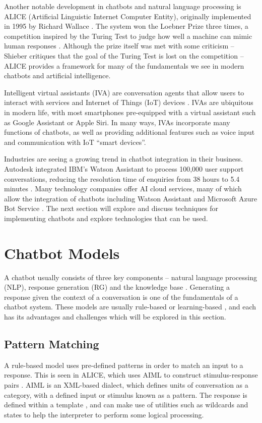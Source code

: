 Another notable development in chatbots and natural language processing is ALICE (Artificial Linguistic Internet Computer Entity), originally implemented in 1995 by Richard Wallace \cite{wallace2009anatomy}. The system won the Loebner Prize three times, a competition inspired by the Turing Test to judge how well a machine can mimic human responses \cite{keedwell2014loebner}. Although the prize itself was met with some criticism -- Shieber critiques that the goal of the Turing Test is lost on the competition \cite{shieber1994lessons} -- ALICE provides a framework for many of the fundamentals we see in modern chatbots and artificial intelligence.

Intelligent virtual assistants (IVA) are conversation agents that allow users to interact with services and Internet of Things (IoT) devices \cite{chung2018intelligent}. IVAs are ubiquitous in modern life, with most smartphones pre-equipped with a virtual assistant such as Google Assistant or Apple Siri. In many ways, IVAs incorporate many functions of chatbots, as well as providing additional features such as voice input and communication with IoT “smart devices”.

Industries are seeing a growing trend in chatbot integration in their business. Autodesk integrated IBM’s Watson Assistant \cite{ibm2017watson} to process 100,000 user support conversations, reducing the resolution time of enquiries from 38 hours to 5.4 minutes \cite{ibm2017autodesk}. Many technology companies offer AI cloud services, many of which allow the integration of chatbots including Watson Assistant and Microsoft Azure Bot Service \cite{microsoft2019azure}. The next section will explore and discuss techniques for implementing chatbots and explore technologies that can be used.

\newpage
\section{Chatbot Models}
A chatbot usually consists of three key components – natural language processing (NLP), response generation (RG) and the knowledge base \cite{cahn2017chatbot}. Generating a response given the context of a conversation is one of the fundamentals of a chatbot system. These models are usually rule-based or learning-based \cite{wang2013dataset}, and each has its advantages and challenges which will be explored in this section.

\subsection{Pattern Matching}
A rule-based model uses pre-defined patterns in order to match an input to a response. This is seen in ALICE, which uses AIML to construct stimulus-response pairs \cite{wallace2009anatomy}. AIML is an XML-based dialect, which defines units of conversation as a category, with a defined input or stimulus known as a pattern. The response is defined within a template \cite{wallace2009anatomy}, and can make use of utilities such as wildcards and states to help the interpreter to perform some logical processing.

